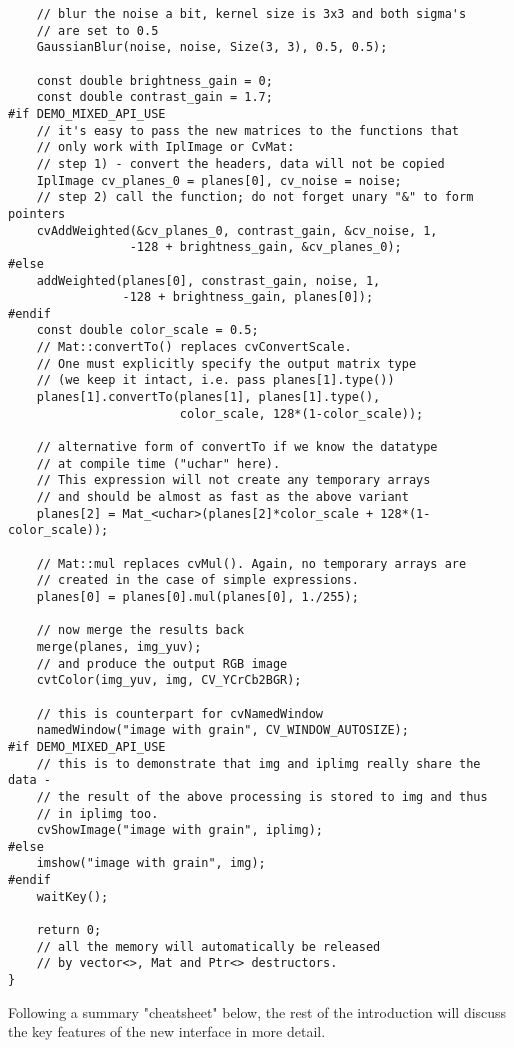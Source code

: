 \begin{lstlisting}
    // blur the noise a bit, kernel size is 3x3 and both sigma's 
	// are set to 0.5
    GaussianBlur(noise, noise, Size(3, 3), 0.5, 0.5);

    const double brightness_gain = 0;
    const double contrast_gain = 1.7;
#if DEMO_MIXED_API_USE
    // it's easy to pass the new matrices to the functions that
    // only work with IplImage or CvMat:
    // step 1) - convert the headers, data will not be copied
    IplImage cv_planes_0 = planes[0], cv_noise = noise;
    // step 2) call the function; do not forget unary "&" to form pointers
    cvAddWeighted(&cv_planes_0, contrast_gain, &cv_noise, 1,
                 -128 + brightness_gain, &cv_planes_0);
#else
    addWeighted(planes[0], constrast_gain, noise, 1,
                -128 + brightness_gain, planes[0]);
#endif
    const double color_scale = 0.5;
    // Mat::convertTo() replaces cvConvertScale.
    // One must explicitly specify the output matrix type
    // (we keep it intact, i.e. pass planes[1].type())
    planes[1].convertTo(planes[1], planes[1].type(),
                        color_scale, 128*(1-color_scale));

    // alternative form of convertTo if we know the datatype
    // at compile time ("uchar" here).
    // This expression will not create any temporary arrays
    // and should be almost as fast as the above variant
    planes[2] = Mat_<uchar>(planes[2]*color_scale + 128*(1-color_scale));

    // Mat::mul replaces cvMul(). Again, no temporary arrays are
    // created in the case of simple expressions.
    planes[0] = planes[0].mul(planes[0], 1./255);

    // now merge the results back
    merge(planes, img_yuv);
    // and produce the output RGB image
    cvtColor(img_yuv, img, CV_YCrCb2BGR);

    // this is counterpart for cvNamedWindow
    namedWindow("image with grain", CV_WINDOW_AUTOSIZE);
#if DEMO_MIXED_API_USE
    // this is to demonstrate that img and iplimg really share the data -
    // the result of the above processing is stored to img and thus 
	// in iplimg too.
    cvShowImage("image with grain", iplimg);
#else
    imshow("image with grain", img);
#endif
    waitKey();

    return 0;
    // all the memory will automatically be released
    // by vector<>, Mat and Ptr<> destructors.
}
\end{lstlisting}

Following a summary "cheatsheet" below, the rest of the introduction will discuss the key features of the new interface in more detail.



